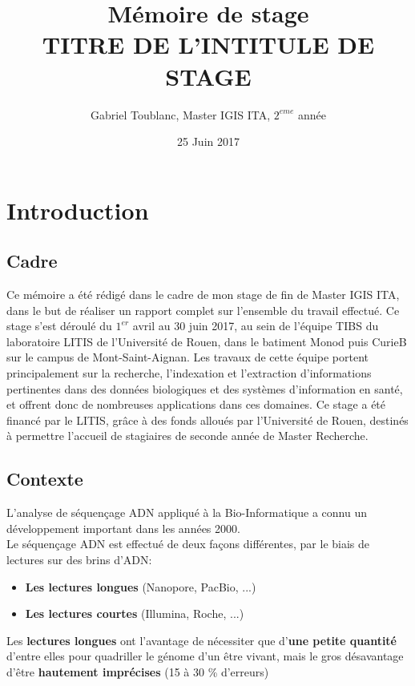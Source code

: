 \documentclass{report}
\title{Mémoire de stage\\
TITRE DE L'INTITULE DE STAGE}
\author{Gabriel Toublanc, Master IGIS ITA, $2^{eme}$ année}
\date{25 Juin 2017}
\begin{document}
  \maketitle\newpage
  \tableofcontents\newpage
  \chapter{Introduction}
    \section{Cadre}
      Ce mémoire a été rédigé dans le cadre de mon stage de fin de Master IGIS ITA, dans le but de réaliser un rapport complet sur l'ensemble du travail effectué. Ce stage s'est déroulé du $1^{er}$ avril au 30 juin 2017, au sein de l'équipe TIBS du laboratoire LITIS de l'Université de Rouen, dans le batiment Monod puis CurieB sur le campus de Mont-Saint-Aignan. Les travaux de
      cette équipe portent principalement sur la recherche, l’indexation et l’extraction d’informations
      pertinentes dans des données biologiques et des systèmes d’information en santé,
      et offrent donc de nombreuses applications dans ces domaines. Ce stage a été financé par le
      LITIS, grâce à des fonds alloués par l’Université de Rouen, destinés à permettre l’accueil
      de stagiaires de seconde année de Master Recherche.
    \section{Contexte}
      L'analyse de séquençage ADN appliqué à la Bio-Informatique a connu un développement important dans les années 2000.\\
      Le séquençage ADN est effectué de deux façons différentes, par le biais de lectures sur des brins d'ADN:
      \begin{itemize}
        \setlength{\itemindent}{30mm}
        \renewcommand{\labelitemi}{$\longrightarrow$}
        \item \textbf{Les lectures longues} (Nanopore, PacBio, ...)
        \item \textbf{Les lectures courtes} (Illumina, Roche, ...)
      \end{itemize}
      Les \textbf{lectures longues} ont l'avantage de nécessiter que d'\textbf{une petite quantité} d'entre elles pour quadriller le génome d'un être vivant, mais le gros désavantage d'être \textbf{hautement imprécises} (15 à 30 \% d'erreurs)\\
\end{document}
